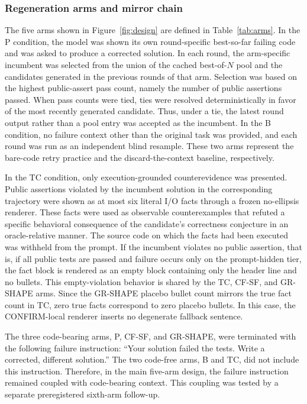 \documentclass{article}
\numberwithin{equation}{section}  %
\theoremstyle{definition}
\newcommand{\armP}{\textsf{P}}
\newcommand{\armB}{\textsf{B}}
\newcommand{\armTC}{\textsf{TC}}
\newcommand{\armCF}{\textsf{CF-SF}}
\newcommand{\armGR}{\textsf{GR-SHAPE}}
\begin{document}
\subsubsection{Regeneration arms and mirror chain}
\label{sec:arms}

The five arms shown in Figure~\ref{fig:design} are defined in Table~\ref{tab:arms}. In the
\armP{} condition, the model was shown its own round-specific best-so-far failing code and was
asked to produce a corrected solution. In each round, the arm-specific incumbent was selected
from the union of the cached best-of-$N$ pool and the candidates generated in the previous
rounds of that arm. Selection was based on the highest public-assert pass count, namely the
number of public assertions passed. When pass counts were tied, ties were resolved
deterministically in favor of the most recently generated candidate. Thus, under a tie, the
latest round output rather than a pool entry was accepted as the incumbent. In the \armB{}
condition, no failure context other than the original task was provided, and each round was
run as an independent blind resample. These two arms represent the bare-code retry practice
and the discard-the-context baseline, respectively.

In the \armTC{} condition, only execution-grounded counterevidence was presented. Public
assertions violated by the incumbent solution in the corresponding trajectory were shown as at
most six literal I/O facts through a frozen no-ellipsis renderer. These facts were used as
observable counterexamples that refuted a specific behavioral consequence of the candidate's
correctness conjecture in an oracle-relative manner. The source code on which the facts had
been executed was withheld from the prompt. If the incumbent violates no public assertion, that
is, if all public tests are passed and failure occurs only on the prompt-hidden tier, the
fact block is rendered as an empty block containing only the header line and no bullets. This
empty-violation behavior is shared by the \armTC{}, \armCF{}, and \armGR{} arms. Since the
\armGR{} placebo bullet count mirrors the true fact count in \armTC{}, zero true facts
correspond to zero placebo bullets. In this case, the CONFIRM-local renderer inserts no
degenerate fallback sentence.

The three code-bearing arms, \armP{}, \armCF{}, and \armGR{}, were terminated with the
following failure instruction: ``Your solution failed the tests. Write a corrected, different
solution.'' The two code-free arms, \armB{} and \armTC{}, did not include this instruction.
Therefore, in the main five-arm design, the failure instruction remained coupled with
code-bearing context. This coupling was tested by a separate preregistered sixth-arm
follow-up.
\end{document}
